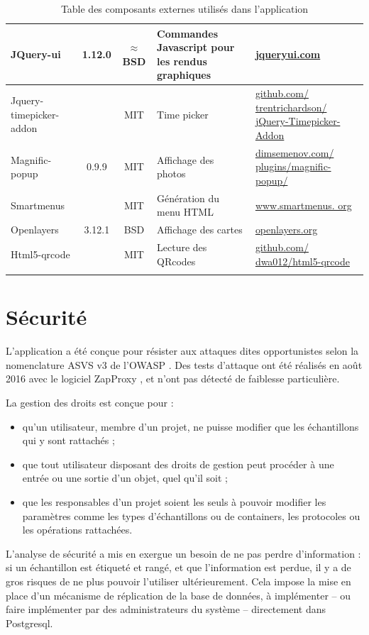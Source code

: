 \begin{longtable}{|>{\raggedright\arraybackslash}p{3cm}|c|c|>{\raggedright\arraybackslash}p{3cm}|>{\raggedright\arraybackslash}p{3cm}|}
\hline 
JQuery-ui & 1.12.0 & $\approx$ BSD & Commandes Javascript pour les rendus graphiques & \href{http://jqueryui.com/}{jqueryui.com} \\ 
\hline 
Jquery-timepicker-addon &  & MIT & Time picker & \href{https://github.com/trentrichardson/jQuery-Timepicker-Addon}{github.com/ trentrichardson/ jQuery-Timepicker-Addon} \\ 
\hline 
Magnific-popup & 0.9.9 & MIT & Affichage des photos & \href{http://dimsemenov.com/plugins/magnific-popup/}{dimsemenov.com/ plugins/magnific-popup/}\\ 
\hline 
Smartmenus &  & MIT & Génération du menu HTML & \href{http://www.smartmenus.org}{www.smartmenus. org} \\ 
\hline 
Openlayers & 3.12.1 & BSD & Affichage des cartes & \href{http://openlayers.org/}{openlayers.org} \\ 
\hline 
Html5-qrcode &  & MIT & Lecture des QRcodes &  \href{https://github.com/dwa012/html5-qrcode}{github.com/ dwa012/html5-qrcode}\\ 
\hline 

\caption{Table des composants externes utilisés dans l'application}
\end{longtable} 

\section{Sécurité}

L'application a été conçue pour résister aux attaques dites opportunistes selon la nomenclature ASVS v3 \cite{asvs} de l'OWASP \cite{owasp}. Des tests d'attaque ont été réalisés en août 2016 avec le logiciel ZapProxy \cite{zaproxy}, et n'ont pas détecté de faiblesse particulière.

La gestion des droits est conçue pour :
\begin{itemize}
\item qu'un utilisateur, membre d'un projet, ne puisse modifier que les échantillons qui y sont rattachés ;
\item que tout utilisateur disposant des droits de gestion peut procéder à une entrée ou une sortie d'un objet, quel qu'il soit ;
\item que les responsables d'un projet soient les seuls à pouvoir modifier les paramètres comme les types d'échantillons ou de containers, les protocoles ou les opérations rattachées.
\end{itemize}
L'analyse de sécurité a mis en exergue un besoin de ne pas perdre d'information : si un échantillon est étiqueté et rangé, et que l'information est perdue, il y a de gros risques de ne plus pouvoir l'utiliser ultérieurement. Cela impose la mise en place d'un mécanisme de réplication de la base de données, à implémenter -- ou faire implémenter par des administrateurs du système -- directement dans Postgresql.


